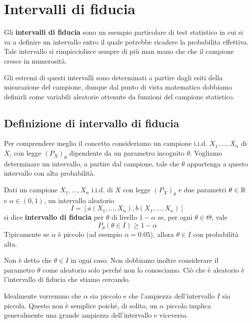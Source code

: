 \chapter{Intervalli di fiducia}
Gli \textbf{intervalli di fiducia} sono un esempio particolare di test statistico in cui si va a
definire un intervallo entro il quale potrebbe ricadere la probabilita effettiva. Tale intervallo
si rimpicciolisce sempre di più man mano che che il campione cresce in numerosità.

Gli estremi di questi intervalli sono determinati a partire dagli esiti della misurazione del
campione, dunque dal punto di vista matematico dobbiamo definirli come variabili aleatorie
ottenute da funzioni del campione statistico.

\section{Definizione di intervallo di fiducia}
Per comprendere meglio il concetto consideriamo un campione i.i.d. $X_1, \dots, X_n$ di $X$, con
legge $(P_X)_\theta$ dipendente da un parametro incognito $\theta$. Vogliamo determinare un
intervallo, a partire dal campione, tale che $\theta$ appartenga a questo intervallo con alta
probabilità.

\begin{definition}
	Dati un campione $X_1, \dots, X_n$ i.i.d. di $X$ con legge $(P_X)_\theta$ e due parametri
	$\theta \in \mathbb{R}$ e $\alpha \in (0,1)$, un intervallo aleatorio
	\[ I = [a(X_1, \dots, X_n), b(X_1, \dots, X_n)] \]
	si dice \textbf{intervallo di fiducia} per $\theta$ di livello $1-\alpha$ se, per ogni
	$\theta \in \Theta$, vale
	\[ P_\theta (\theta \in I) \geq 1 - \alpha \]
	Tipicamente se $\alpha$ è piccolo (ad esempio $\alpha = 0.05$), allora $\theta \in I$ con
	probabilità alta.
\end{definition}

\begin{observation}
	Non è detto che $\theta \in I$ in ogni caso. Non dobbiamo inoltre considerare il parametro
	$\theta$ come aleatorio solo perché non lo conosciamo. Ciò che è aleatorio è l'intervallo di
	fiducia che stiamo cercando.
\end{observation}

Idealmente vorremmo che $\alpha$ sia piccolo e che l'ampiezza dell'intervallo $I$ sia piccola.
Questo non è semplice poiché, di solito, un $\alpha$ piccolo implica generalmente una grande
ampiezza dell'intervallo e viceversa.